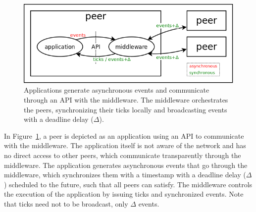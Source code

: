 \documentclass[10pt,journal,compsoc]{IEEEtran}
\begin{document}
\begin{figure}
  \centering
  \includegraphics[width=\linewidth]{middleware}
  \caption{
    Applications generate asynchronous events and communicate through an API
    with the middleware.
    The middleware orchestrates the peers, synchronizing their ticks locally
    and broadcasting events with a deadline delay ($\Delta$).
    \label{fig.middleware}
  }
\end{figure}

In Figure~\ref{fig.middleware}, a peer is depicted as an application using an
API to communicate with the middleware.
The application itself is not aware of the network and has no direct access to
other peers, which communicate transparently through the middleware.
The application generates asynchronous events that go through the middleware,
which synchronizes them with a timestamp with a deadline delay ($\Delta$)
scheduled to the future, such that all peers can satisfy.
The middleware controls the execution of the application by issuing ticks and
synchronized events.
Note that ticks need not to be broadcast, only $\Delta$ events.
\end{document}
